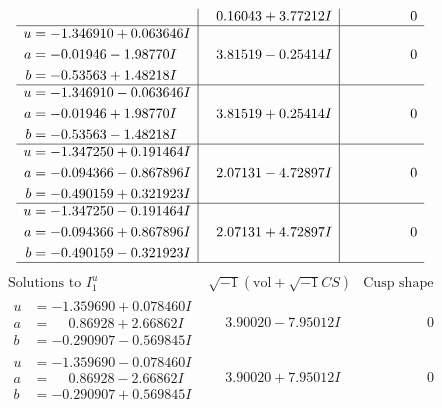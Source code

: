\documentclass[1p]{elsarticle_modified}
\theoremstyle{definition}
\newcommand{\I}{\sqrt{-1}}
\begin{document}
$$\begin{array}{c|c|c}
 & \phantom{-}0.16043 + 3.77212 I & \phantom{-0.000000 } 0 \\ \hline\begin{aligned}
u &= -1.346910 + 0.063646 I \\
a &= -0.01946 - 1.98770 I \\
b &= -0.53563 + 1.48218 I\end{aligned}
 & \phantom{-}3.81519 - 0.25414 I & \phantom{-0.000000 } 0 \\ \hline\begin{aligned}
u &= -1.346910 - 0.063646 I \\
a &= -0.01946 + 1.98770 I \\
b &= -0.53563 - 1.48218 I\end{aligned}
 & \phantom{-}3.81519 + 0.25414 I & \phantom{-0.000000 } 0 \\ \hline\begin{aligned}
u &= -1.347250 + 0.191464 I \\
a &= -0.094366 - 0.867896 I \\
b &= -0.490159 + 0.321923 I\end{aligned}
 & \phantom{-}2.07131 - 4.72897 I & \phantom{-0.000000 } 0 \\ \hline\begin{aligned}
u &= -1.347250 - 0.191464 I \\
a &= -0.094366 + 0.867896 I \\
b &= -0.490159 - 0.321923 I\end{aligned}
 & \phantom{-}2.07131 + 4.72897 I & \phantom{-0.000000 } 0\\
 \hline 
 \end{array}$$\newpage$$\begin{array}{c|c|c}  
\text{Solutions to }I^u_{1}& \I (\text{vol} + \sqrt{-1}CS) & \text{Cusp shape}\\
 \hline 
\begin{aligned}
u &= -1.359690 + 0.078460 I \\
a &= \phantom{-}0.86928 + 2.66862 I \\
b &= -0.290907 - 0.569845 I\end{aligned}
 & \phantom{-}3.90020 - 7.95012 I & \phantom{-0.000000 } 0 \\ \hline\begin{aligned}
u &= -1.359690 - 0.078460 I \\
a &= \phantom{-}0.86928 - 2.66862 I \\
b &= -0.290907 + 0.569845 I\end{aligned}
 & \phantom{-}3.90020 + 7.95012 I & \phantom{-0.000000 } 0 \\ \hline\begin{aligned}

\end{aligned}
\end{array}$$
\end{document}
